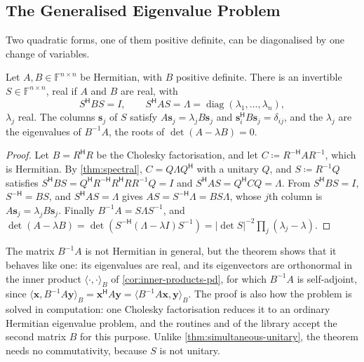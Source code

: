 \subsection{The Generalised Eigenvalue Problem}

Two quadratic forms, one of them positive definite, can be diagonalised by one change of variables.

\begin{theorem}
\label{thm:generalised-eigen}
Let $A,B\in\mathbb F^{n\times n}$ be Hermitian, with $B$ positive definite. There is an invertible $S\in\mathbb F^{n\times n}$, real if $A$ and $B$ are real, with
\[
S^{\mathsf H}BS=I,\qquad S^{\mathsf H}AS=\Lambda=\operatorname{diag}(\lambda_1,\ldots,\lambda_n),
\]
$\lambda_j$ real. The columns $\mathbf s_j$ of $S$ satisfy $A\mathbf s_j=\lambda_jB\mathbf s_j$ and $\mathbf s_i^{\mathsf H}B\mathbf s_j=\delta_{ij}$, and the $\lambda_j$ are the eigenvalues of $B^{-1}A$, the roots of $\det(A-\lambda B)=0$.
\end{theorem}

\begin{proof}
Let $B=R^{\mathsf H}R$ be the Cholesky factorisation, and let $C\coloneqq R^{-\mathsf H}AR^{-1}$, which is Hermitian. By \cref{thm:spectral}, $C=Q\Lambda Q^{\mathsf H}$ with a unitary $Q$, and $S\coloneqq R^{-1}Q$ satisfies $S^{\mathsf H}BS=Q^{\mathsf H}R^{-\mathsf H}R^{\mathsf H}RR^{-1}Q=I$ and $S^{\mathsf H}AS=Q^{\mathsf H}CQ=\Lambda$. From $S^{\mathsf H}BS=I$, $S^{-\mathsf H}=BS$, and $S^{\mathsf H}AS=\Lambda$ gives $AS=S^{-\mathsf H}\Lambda=BS\Lambda$, whose $j$th column is $A\mathbf s_j=\lambda_jB\mathbf s_j$. Finally $B^{-1}A=S\Lambda S^{-1}$, and $\det(A-\lambda B)=\det(S^{-\mathsf H}(\Lambda-\lambda I)S^{-1})=|\det S|^{-2}\prod_j(\lambda_j-\lambda)$.
\end{proof}

The matrix $B^{-1}A$ is not Hermitian in general, but the theorem shows that it behaves like one: its eigenvalues are real, and its eigenvectors are orthonormal in the inner product $\langle\cdot,\cdot\rangle_B$ of \cref{cor:inner-products-pd}, for which $B^{-1}A$ is self-adjoint, since $\langle\mathbf x,B^{-1}A\mathbf y\rangle_B=\mathbf x^{\mathsf H}A\mathbf y=\langle B^{-1}A\mathbf x,\mathbf y\rangle_B$. The proof is also how the problem is solved in computation: one Cholesky factorisation reduces it to an ordinary Hermitian eigenvalue problem, and the routines  and  of the library accept the second matrix $B$ for this purpose. Unlike \cref{thm:simultaneous-unitary}, the theorem needs no commutativity, because $S$ is not unitary.

